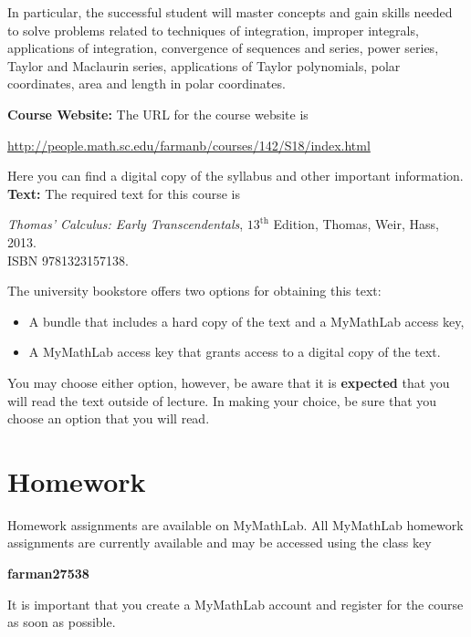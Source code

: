 \documentclass[10pt]{amsart}
\begin{document}
In particular, the successful student will master concepts and gain skills needed to solve problems related to techniques of integration, improper integrals, applications of integration, convergence of sequences and series, power series, Taylor and Maclaurin series, applications of Taylor polynomials, polar coordinates, area and length in polar coordinates.\\

\newpage

\noindent\textbf{Course Website:} The URL for the course website is
\begin{center}
  \url{http://people.math.sc.edu/farmanb/courses/142/S18/index.html}
\end{center}
Here you can find a digital copy of the syllabus and other important information.\\

\noindent\textbf{Text:}
The required text for this course is
\begin{center}
  {\it Thomas' Calculus: Early Transcendentals}, $13^{\text{th}}$ Edition, Thomas, Weir, Hass, 2013.  \\ISBN 9781323157138.
\end{center}

\noindent
The university bookstore offers two options for obtaining this text:
\begin{itemize}
\item
  A bundle that includes a hard copy of the text and a MyMathLab access key,
\item
  A MyMathLab access key that grants access to a digital copy of the text.
\end{itemize}
You may choose either option, however, be aware that it is {\bf expected} that you will read the text outside of lecture.
In making your choice, be sure that you choose an option that you will read.

\section*{Homework}
\noindent Homework assignments are available on MyMathLab.
All MyMathLab homework assignments are currently available and may be accessed using the class key
\begin{center}
  {\bf farman27538}
\end{center}
It is important that you create a MyMathLab account and register for the course as soon as possible.
\end{document}
